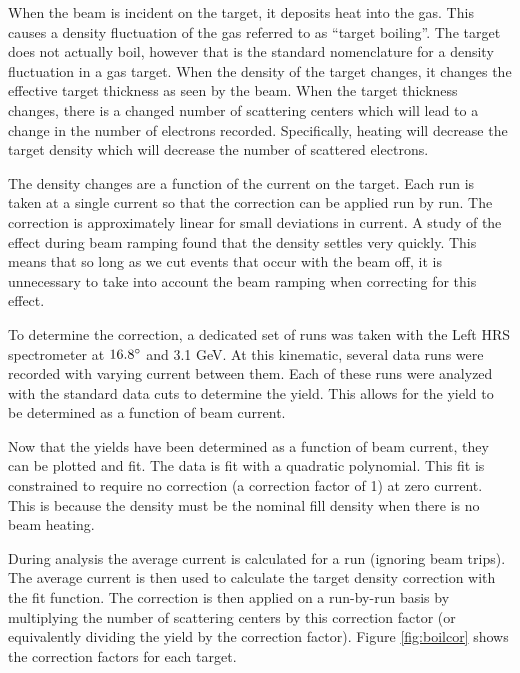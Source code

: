When the beam is incident on the target, it deposits heat into the gas. This causes a density fluctuation of the gas referred to as ``target boiling''. The target does not actually boil, however that is the standard nomenclature for a density fluctuation in a gas target. When the density of the target changes, it changes the effective target thickness as seen by the beam. When the target thickness changes, there is a changed number of scattering centers which will lead to a change in the number of electrons recorded. Specifically, heating will decrease the target density which will decrease the number of scattered electrons.

The density changes are a function of the current on the target. Each run is taken at a single current so that the correction can be applied run by run. The correction is approximately linear for small deviations in current. A study of the effect during beam ramping found that the density settles very quickly. This means that so long as we cut events that occur with the beam off, it is unnecessary to take into account the beam ramping when correcting for this effect.

To determine the correction, a dedicated set of runs was taken with the Left HRS spectrometer at $16.8\degree$ and 3.1 GeV. At this kinematic, several data runs were recorded with varying current between them. Each of these runs were analyzed with the standard data cuts to determine the yield. This allows for the yield to be determined as a function of beam current.

Now that the yields have been determined as a function of beam current, they can be plotted and fit. The data is fit with a quadratic polynomial. This fit is constrained to require no correction (a correction factor of 1) at zero current. This is because the density must be the nominal fill density when there is no beam heating.


During analysis the average current is calculated for a run (ignoring beam trips). The average current is then used to calculate the target density correction with the fit function. The correction is then applied on a run-by-run basis by multiplying the number of scattering centers by this correction factor (or equivalently dividing the yield by the correction factor). Figure \ref{fig:boilcor} shows the correction factors for each target.\cite{boiling}

